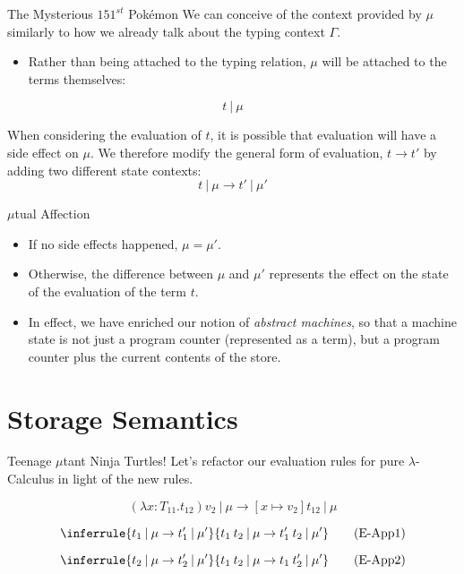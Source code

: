 \documentclass[11pt]{beamer}
\begin{document}
\begin{frame}[fragile=singleslide]{The Mysterious $151^{st}$ Pok\'emon}
We can conceive of the context provided by $\mu$ similarly to how we already talk about the typing context $\Gamma$.
\begin{itemize}
\item Rather than being attached to the typing relation, $\mu$ will be attached to the terms themselves:
\end{itemize}

\begin{equation}
t\:|\:\mu
\end{equation}

When considering the evaluation of $t$, it is possible that evaluation will have a side effect on $\mu$.  We therefore modify the general form of evaluation, $t \rightarrow t'$ by adding two different state contexts:
\begin{equation}
t\:|\:\mu \rightarrow t'\:|\:\mu'
\end{equation}
\end{frame}


\begin{frame}[fragile=singleslide]{$\mu$tual Affection}
\begin{itemize}
\item If no side effects happened, $\mu = \mu'$. 
\item Otherwise, the difference between $\mu$ and $\mu'$ represents the effect on the state of the evaluation of the term $t$.
\item In effect, we have enriched our notion of \emph{abstract machines}, so that a machine state is not just a program counter (represented as a term), but a program counter plus the current contents of the store.  
\end{itemize}
\end{frame}

\section[Semantics]{Storage Semantics}
\begin{frame}[fragile=singleslide]{Teenage $\mu$tant Ninja Turtles!}
Let's refactor our evaluation rules for pure $\lambda$-Calculus in light of the new rules.  

\begin{equation}
(\lambda x: T_{11}. t_{12}) v_2\:|\:\mu \rightarrow [x \mapsto v_2]t_{12}\:|\:\mu \tag{E-AppAbs}
\end{equation}

\begin{equation}
\inferrule{t_1\:|\:\mu \rightarrow t_1'\:|\:\mu'}{t_1\:t_2\:|\:\mu \rightarrow t_1'\:t_2\:|\:\mu'} \tag{E-App1}
\end{equation}

\begin{equation}
\inferrule{t_2\:|\:\mu \rightarrow t_2'\:|\:\mu'}{t_1\:t_2\:|\:\mu \rightarrow t_1\:t_2'\:|\:\mu'} \tag{E-App2}
\end{equation}
\end{frame}
\end{document}
